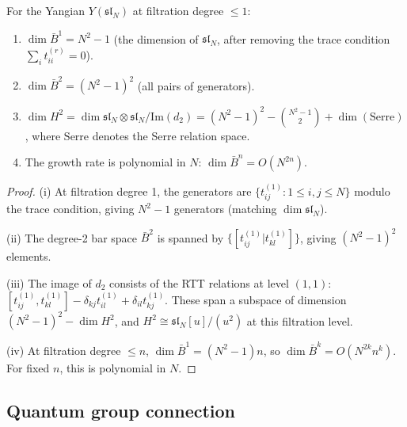 \begin{proposition}
\label{prop:yangian-rank-dependence}

For the Yangian $Y(\mathfrak{sl}_N)$ at filtration degree $\leq 1$:
\begin{enumerate}
\item $\dim \bar{B}^1 = N^2 - 1$ (the dimension of $\mathfrak{sl}_N$,
after removing the trace condition $\sum_i t_{ii}^{(r)} = 0$).
\item $\dim \bar{B}^2 = (N^2-1)^2$ (all pairs of generators).
\item $\dim H^2 = \dim \mathfrak{sl}_N \otimes \mathfrak{sl}_N / \mathrm{Im}(d_2)
= (N^2-1)^2 - \binom{N^2-1}{2} + \dim(\mathrm{Serre})$,
where $\mathrm{Serre}$ denotes the Serre relation space.
\item The growth rate is polynomial in $N$: $\dim \bar{B}^n = O(N^{2n})$.
\end{enumerate}
\end{proposition}

\begin{proof}
(i) At filtration degree 1, the generators are
$\{t_{ij}^{(1)} : 1 \leq i,j \leq N\}$ modulo the trace
condition, giving $N^2 - 1$ generators (matching $\dim \mathfrak{sl}_N$).

(ii) The degree-2 bar space $\bar{B}^2$ is spanned by
$\{[t_{ij}^{(1)} | t_{kl}^{(1)}]\}$, giving $(N^2-1)^2$ elements.

(iii) The image of $d_2$ consists of the RTT relations at
level $(1,1)$: $[t_{ij}^{(1)}, t_{kl}^{(1)}] - \delta_{kj} t_{il}^{(1)}
+ \delta_{il} t_{kj}^{(1)}$.  These span a subspace of
dimension $(N^2-1)^2 - \dim H^2$, and $H^2 \cong \mathfrak{sl}_N[u]/(u^2)$
at this filtration level.

(iv) At filtration degree $\leq n$, $\dim \bar{B}^1 = (N^2-1)n$,
so $\dim \bar{B}^k = O(N^{2k} n^k)$.  For fixed $n$, this is
polynomial in $N$.
\end{proof}


\subsection{Quantum group connection}

